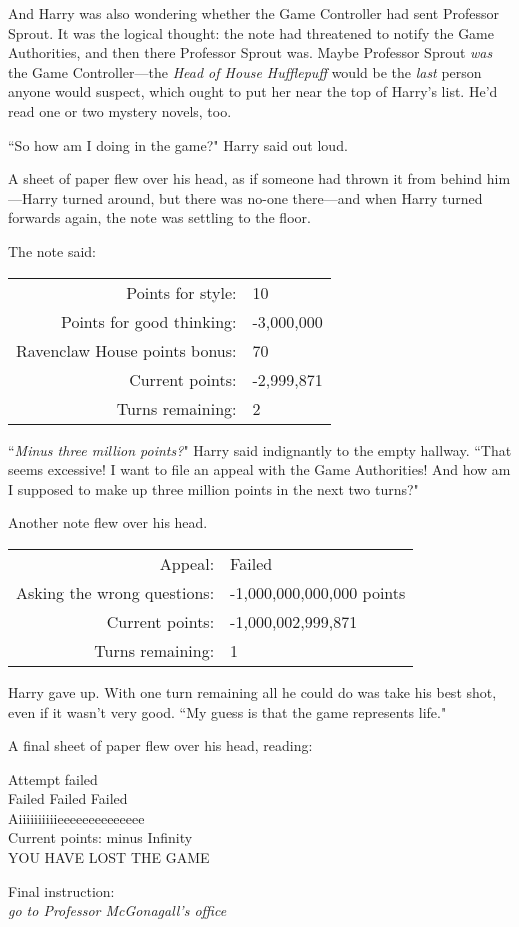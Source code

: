 And Harry was also wondering whether the Game Controller had sent Professor Sprout. It was the logical thought: the note had threatened to notify the Game Authorities, and then there Professor Sprout was. Maybe Professor Sprout \emph{was} the Game Controller—the \emph{Head of House Hufflepuff} would be the \emph{last} person anyone would suspect, which ought to put her near the top of Harry's list. He'd read one or two mystery novels, too.

``So how am I doing in the game?" Harry said out loud.

A sheet of paper flew over his head, as if someone had thrown it from behind him—Harry turned around, but there was no-one there—and when Harry turned forwards again, the note was settling to the floor.

The note said:
\begin{writtenNote}
\begin{tabular}{rl}
Points for style: & 10\\
Points for good thinking: & -3,000,000\\
Ravenclaw House points bonus: & 70\\
Current points: & -2,999,871\\
Turns remaining: & 2
\end{tabular}
\end{writtenNote}

``\emph{Minus three million points?}" Harry said indignantly to the empty hallway. ``That seems excessive! I want to file an appeal with the Game Authorities! And how am I supposed to make up three million points in the next two turns?"

Another note flew over his head.
\begin{writtenNote}
\begin{tabular}{rl}
Appeal: & Failed\\
Asking the wrong questions: & -1,000,000,000,000 points\\
Current points: & -1,000,002,999,871\\
Turns remaining: & 1
\end{tabular}
\end{writtenNote}

Harry gave up. With one turn remaining all he could do was take his best shot, even if it wasn't very good. ``My guess is that the game represents life."

A final sheet of paper flew over his head, reading:

\begin{writtenNote}
Attempt failed\\
Failed Failed Failed\\
Aiiiiiiiiiieeeeeeeeeeeeee\\
Current points: minus Infinity\\
\MakeUppercase{You have lost the game}

Final instruction:\\
\emph{go to Professor McGonagall's office}
\end{writtenNote}

